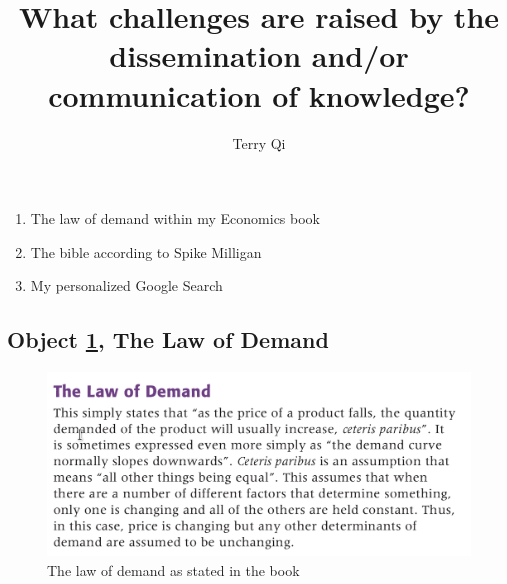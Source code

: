 \documentclass[a4paper,11pt]{article}
\title{What challenges are raised by the dissemination and/or communication of knowledge?}
\author{Terry Qi}
\begin{document}
\maketitle
\begin{enumerate}
 \item The law of demand within my Economics book
 \item The bible according to Spike Milligan
 \item My personalized Google Search
\end{enumerate}

\newpage




\subsection*{Object \ref{fig:lod}, The Law of Demand}

\begin{figure}[h!]
 \centering
 \includegraphics[scale=0.3]{ecobook.png}
 \caption{The law of demand as stated in the book}
 \label{fig:lod}
\end{figure}
\end{document}
